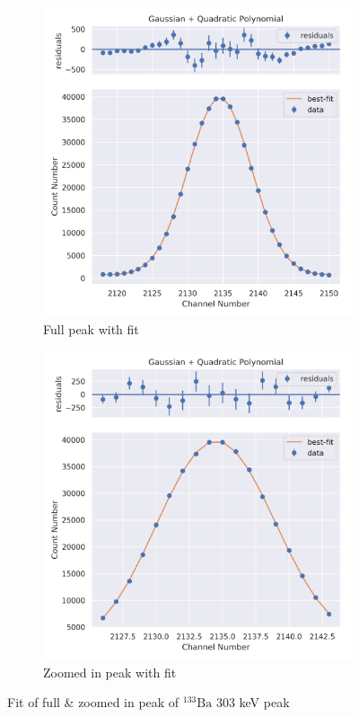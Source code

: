 \documentclass[11pt,a4paper]{article}
\newcommand{\element}[2]{$^{#2}\textrm{#1}$}
\begin{document}
\begin{figure}[H]
  \centering
  \begin{subfigure}{.5\linewidth}
    \centering
    \includegraphics[width=\linewidth]{./Images/Barium133/Quad/Quad_5_Full.png}
    \caption{Full peak with fit}
  \end{subfigure}%
  \begin{subfigure}{.5\linewidth}
    \centering
    \includegraphics[width=\linewidth]{./Images/Barium133/Quad/Quad_5_Zoom.png}
    \caption{Zoomed in peak with fit}
  \end{subfigure}
  \caption{Fit of full \& zoomed in peak of \element{Ba}{133} 303 keV peak}
\end{figure}
\end{document}
